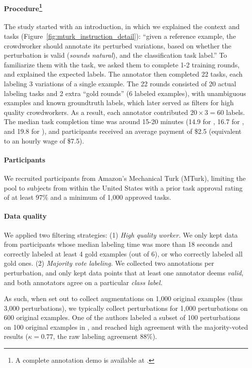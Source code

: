 \paragraph{Procedure\footnote{A complete annotation demo is available at \mturkurl.}}
The study started with an introduction, in which we explained the context and tasks (Figure~\ref{fig:mturk_instruction_detail}): 
``given a reference example, the crowdworker should annotate its perturbed variations, based on whether the perturbation is valid (\emph{sounds natural}), and the classification task label.''
To familiarize them with the task, we asked them to complete 1-2 training rounds, and explained the expected labels.
The annotator then completed 22 tasks, each labeling 3 variations of a single example.
The 22 rounds consisted of 20 actual labeling tasks and 2 extra ``gold rounds'' (6 labeled examples), with unambiguous examples and known groundtruth labels, which later served as filters for high quality crowdworkers.
As a result, each annotator contributed $20 \times 3=60$ labels.
The median task completion time was around 15-20 minutes (14.9 for \qqp, 16.7 for \sst, and 19.8 for \nli), and participants received an average payment of \$2.5 (equivalent to an hourly wage of \$7.5).

\paragraph{Participants}
We recruited participants from Amazon's Mechanical Turk (MTurk), limiting the pool to subjects from within the United States with a prior task approval rating of at least 97\% and a minimum of 1,000 approved tasks.

\paragraph{Data quality}
We applied two filtering strategies: 
(1) \emph{High quality worker.} 
We only kept data from participants whose median labeling time was more than 18 seconds and correctly labeled at least 4 gold examples (out of 6), or who correctly labeled all gold ones.
(2) \emph{Majority vote labeling.}
We collected two annotations per perturbation, and only kept data points that at least one annotator deems \emph{valid}, and both annotators agree on a particular \emph{class label.}

As such, when set out to collect augmentations on 1,000 original examples (thus 3,000 perturbations), we typically collect perturbations for 1,000 perturbations on 600 original examples.
One of the authors labeled a subset of 100 perturbations on 100 original examples in \sst, and reached high agreement with the majority-voted results ($\kappa=0.77$, the raw labeling agreement $88\%$).
